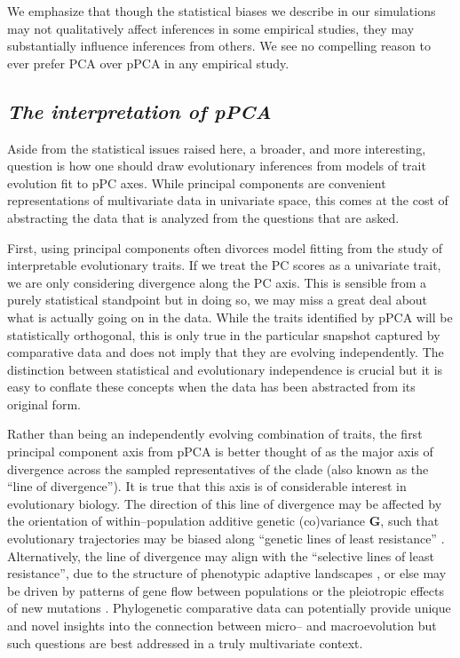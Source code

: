 \documentclass[a4paper,11pt]{article}
\begin{document}
We emphasize that though the statistical biases we describe in our simulations may not qualitatively affect inferences in some empirical studies, they may substantially influence inferences from others. We see no compelling reason to ever prefer PCA over pPCA in any empirical study.  

\subsection{\emph{The interpretation of pPCA}}

Aside from the statistical issues raised here, a broader, and more interesting, question is how one should draw evolutionary inferences from models of trait evolution fit to pPC axes. While principal components are convenient representations of multivariate data in univariate space, this comes at the cost of abstracting the data that is analyzed from the questions that are asked. 

First, using principal components often divorces model fitting from the study of interpretable evolutionary traits. If we treat the PC scores as a univariate trait, we are only considering divergence along the PC axis. This is sensible from a purely statistical standpoint but in doing so, we may miss a great deal about what is actually going on in the data. While the traits identified by pPCA will be statistically orthogonal, this is only true in the particular snapshot captured by comparative data and does not imply that they are evolving independently. The distinction between statistical and evolutionary independence is crucial \citep{HansenHoule2008} but it is easy to conflate these concepts when the data has been abstracted from its original form. 

Rather than being an independently evolving combination of traits, the first principal component axis from pPCA is better thought of as the major axis of divergence across the sampled representatives of the clade (also known as the ``line of divergence''). It is true that this axis is of considerable interest in evolutionary biology. The direction of this line of divergence may be affected by the orientation of within--population additive genetic (co)variance $\mathbf{G}$, such that evolutionary trajectories may be biased along ``genetic lines of least resistance'' \citep[i.e., divergence occurs primarily along the leading eigenvector of $\mathbf{G}$, $G_{\text{max}}$;][]{Schluter1996}. Alternatively, the line of divergence may align with the ``selective lines of least resistance'', due to the structure of phenotypic adaptive landscapes \citep{Jonesetal2007, Arnoldetal2008}, or else may be driven by patterns of gene flow between populations \citep{Guillaume2007} or the pleiotropic effects of new mutations \citep{Jonesetal2007, Hether2013}. Phylogenetic comparative data can potentially provide unique and novel insights into the connection between micro-- and macroevolution \citep{Hohenlohe2008} but such questions are best addressed in a truly multivariate context. 
\end{document}
